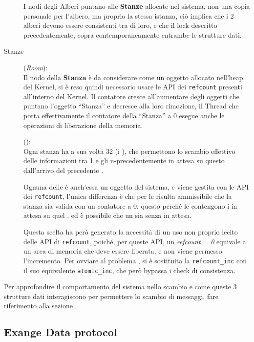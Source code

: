 \begin{description}
I nodi degli Alberi puntano alle \textbf{Stanze} allocate nel sistema, non una copia personale per l'albero, ma
proprio la stessa istanza, ciò implica che i 2 alberi devono essere consistenti tra di loro, e che il lock
descritto precedentemente, copra contemporaneamente entrambe le strutture dati.

\item[Stanze] (\textit{Room}):\\
Il nodo della \textbf{Stanza} è da considerare come un oggetto allocato nell'heap del Kernel, si è reso
quindi necessario usare le API dei \texttt{refcount} presenti all'interno del Kernel. Il contatore cresce all'aumentare
degli oggetti che puntano l'oggetto ``Stanza'' e decresce alla loro rimozione, il Thread che porta
effettivamente il contatore della ``Stanza'' a 0 esegue anche le operazioni di liberazione della memoria.

\item[\Topic] (\exangeRoom):\\
Ogni stanza ha a sua volta 32 \exangeRoom (i \Topic), che permettono lo scambio effettivo delle informazioni
tra 1 \Writer e gli n-\Reader precedentemente in attesa su questo \Topic dall'arrivo del precedente \Writer.

Ognuna delle \exangeRoom è anch'essa un oggetto del sistema, e viene gestita con le API dei \texttt{refcount},
l'unica differenza è che per le \exangeRoom risulta ammissibile che la stanza sia valida con un contatore a 0,
questo perché le \exangeRoom contengono i \Reader in attesa su quel \Topic, ed è possibile che un \Topic sia
senza \Reader in attesa.

Questa scelta ha però generato la necessità di un uso non proprio lecito delle API di \texttt{refcount},
poiché, per queste API, un \textit{refcount = 0} equivale a un area di memoria che deve essere liberata, e non viene
permesso l'incremento. Per ovviare al problema , si è sostituita la \verb|refcount_inc| con il suo equivalente
\verb|atomic_inc|, che però bypassa i check di consistenza.
\end{description}

\begin{scriptsize}
Per approfondire il comportamento del sistema nello scambio e come queste 3 strutture dati interagiscono per permettere
lo scambio di messaggi, fare riferimento alla sezione .
\end{scriptsize}

\newpage

\subsection{Exange Data protocol} \label{exangeDataProtocol}

